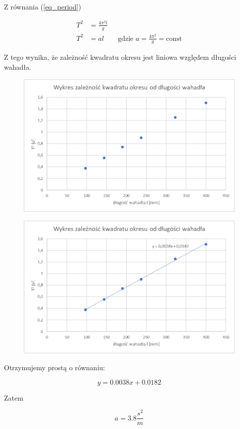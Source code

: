 \documentclass{fizykalab}
\begin{document}
Z równania (\ref{eq_period})

\begin{align*}
    \label{eq_period_sqr}
    T^2 &= \frac{4\pi^2l}{g}\\
    T^2 &= al \qquad \text{gdzie  } a = \frac{4\pi^2}{g} = \text{const}
\end{align*}

Z tego wynika, że zależność kwadratu okresu jest liniowa względem długości wahadła.

\begin{figure}[H]
    \centering
    \includegraphics[width=0.75\linewidth]{wykres-1.png}
    \label{fig:enter-label}
\end{figure}

\begin{figure}[H]
    \centering
    \includegraphics[width=0.75\linewidth]{wykres-2.png}
    \label{fig:enter-label}
\end{figure}


Otrzymujemy prostą o równaniu: 

\begin{equation*}
    y = 0.0038x + 0.0182
\end{equation*}

Zatem

\begin{equation*}
    a = 3.8\frac{s^2}{m}
\end{equation*}
\end{document}
